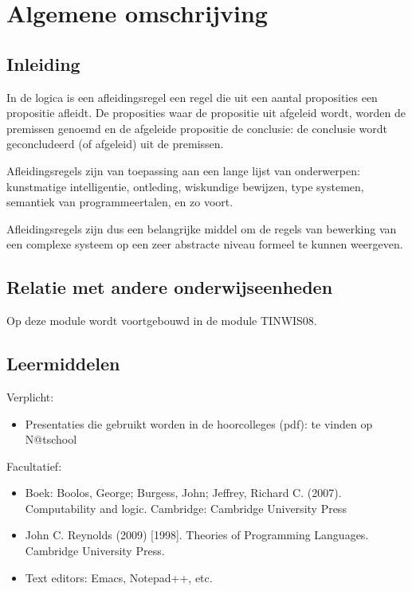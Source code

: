 \section{Algemene omschrijving}
	\subsection{Inleiding}
		In de logica is een afleidingsregel een regel die uit een aantal proposities een propositie afleidt. De proposities waar de propositie uit afgeleid wordt, worden de premissen genoemd en de afgeleide propositie de conclusie: de conclusie wordt geconcludeerd (of afgeleid) uit de premissen.
	
		Afleidingsregels zijn van toepassing aan een lange lijst van onderwerpen: kunstmatige intelligentie, ontleding, wiskundige bewijzen, type systemen, semantiek van programmeertalen, en zo voort.
		
		Afleidingsregels zijn dus een belangrijke middel om de regels van bewerking van een complexe systeem op een zeer abstracte niveau formeel te kunnen weergeven. \\

	\subsection{Relatie met andere onderwijseenheden}
		Op deze module wordt voortgebouwd in de module TINWIS08. \\

	\subsection{Leermiddelen}
		Verplicht:
		\begin{itemize}
			\item Presentaties die gebruikt worden in de hoorcolleges (pdf): te vinden op N@tschool
		\end{itemize}
		Facultatief:
		\begin{itemize}
			\item Boek: Boolos, George; Burgess, John; Jeffrey, Richard C. (2007). Computability and logic. Cambridge: Cambridge University Press
			\item John C. Reynolds (2009) [1998]. Theories of Programming Languages. Cambridge University Press. \\
			\item Text editors: Emacs, Notepad++, etc.
		\end{itemize}
		